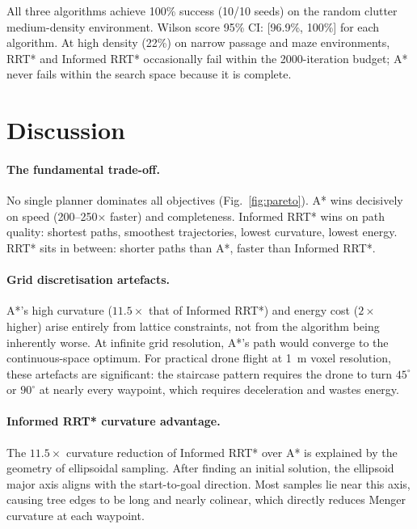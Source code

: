 \documentclass[10pt,twocolumn]{article}
\begin{document}
All three algorithms achieve 100\% success (10/10 seeds) on the random
clutter medium-density environment.
Wilson score 95\% CI: [96.9\%, 100\%] for each algorithm.
At high density (22\%) on narrow passage and maze environments, RRT* and
Informed RRT* occasionally fail within the 2000-iteration budget; A*
never fails within the search space because it is complete.

\section{Discussion}\label{sec:discussion}

\paragraph{The fundamental trade-off.}
No single planner dominates all objectives (Fig.~\ref{fig:pareto}).
A* wins decisively on speed (200--250$\times$ faster) and completeness.
Informed RRT* wins on path quality: shortest paths, smoothest
trajectories, lowest curvature, lowest energy.
RRT* sits in between: shorter paths than A*, faster than Informed RRT*.

\paragraph{Grid discretisation artefacts.}
A*'s high curvature ($11.5\times$ that of Informed RRT*) and energy
cost ($2\times$ higher) arise entirely from lattice constraints, not
from the algorithm being inherently worse.
At infinite grid resolution, A*'s path would converge to the
continuous-space optimum.
For practical drone flight at 1~m voxel resolution, these artefacts are
significant: the staircase pattern requires the drone to turn $45^\circ$
or $90^\circ$ at nearly every waypoint, which requires deceleration and
wastes energy.

\paragraph{Informed RRT* curvature advantage.}
The $11.5\times$ curvature reduction of Informed RRT* over A* is
explained by the geometry of ellipsoidal sampling.
After finding an initial solution, the ellipsoid major axis aligns with
the start-to-goal direction.
Most samples lie near this axis, causing tree edges to be long and
nearly colinear, which directly reduces Menger curvature at each
waypoint.
\end{document}
